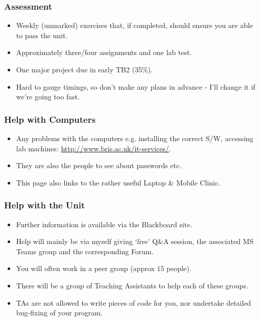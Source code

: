 \begin{frame}%
\frametitle{Assessment}
\begin{itemize}[<+->]
\item Weekly (unmarked) exercises that, if completed, should ensure you are able to pass the unit.
\item Approximately three/four assignments and one lab test.
\item One major project due in early TB2 (35\%).
\item Hard to gauge timings, so don't make any plans in advance -
I'll change it if we're going too fast.
\end{itemize}
\end{frame}


\begin{frame}%
\frametitle{Help with Computers}
\begin{itemize}[<+->]
\item Any problems with the computers e.g. installing the correct S/W, accessing lab machines: \url{http://www.bris.ac.uk/it-services/}.
\item They are also the people to see about passwords etc.
\item This page also links to the rather useful Laptop \& Mobile Clinic.
\end{itemize}
\end{frame}

\begin{frame}%
\frametitle{Help with the Unit}
\begin{itemize}[<+->]
\item Further information is available via the Blackboard site.
\item Help will mainly be via myself giving `live' Q\&A session, the associated MS Teams group and the corresponding Forum.
\item You will often work in a peer group (approx $15$ people).
\item There will be a group of Teaching Assistants to help each of these groups.
\item TAs are not allowed to write pieces of code for you,
nor undertake detailed bug-fixing of your program.
\end{itemize}
\end{frame}
